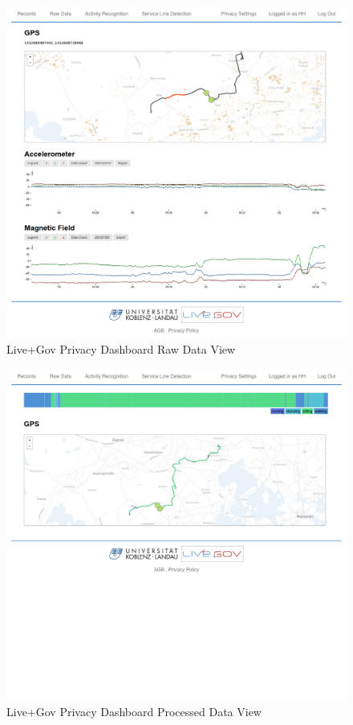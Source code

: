 \begin{figure}
\includegraphics[width=\textwidth]{screenshots/raw.png}
\caption{Live+Gov Privacy Dashboard Raw Data View}
\label{fig:PDRawData}
\end{figure}

\begin{figure}
\includegraphics[width=\textwidth]{screenshots/processed.png}
\caption{Live+Gov Privacy Dashboard Processed Data View}
\label{fig:PDProcessedData}
\end{figure}

